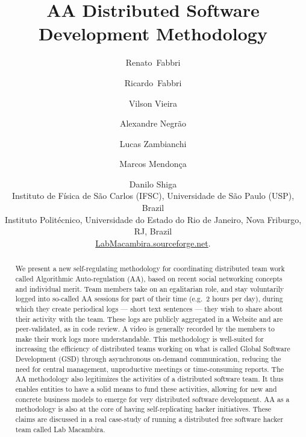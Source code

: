 \title{
AA Distributed Software Development Methodology
}

\author{%
Renato~Fabbri \and Ricardo~Fabbri \and Vilson Vieira \and Alexandre Negr\~{a}o \and Lucas Zambianchi
\and Marcos Mendon\c{c}a \and Danilo Shiga\\[1em]
\small{
Instituto de F\'{i}sica de S\~{a}o Carlos (IFSC), Universidade de
S\~{a}o Paulo (USP), Brazil}\\[0.5em]
\small{Instituto Polit\'{e}cnico, Universidade do Estado do Rio de
Janeiro, Nova Friburgo, RJ, Brazil}\\[0.5em]
\url{LabMacambira.sourceforge.net}.
}


\maketitle

\begin{abstract}
We present a new self-regulating methodology for coordinating
distributed team work called Algorithmic Auto-regulation (AA), based
on recent social networking concepts and individual merit. Team
members take on an egalitarian role, and stay voluntarily logged into
so-called AA sessions for part of their time (e.g.\ 2 hours per day),
during which they create periodical logs --- short text sentences ---
they wish to share about their activity with the team. These logs are
publicly aggregated in a Website and are peer-validated, as in code
review. A video is generally recorded by the members to make their
work logs more understandable. This methodology is well-suited for
increasing the efficiency of distributed teams working on what is
called Global Software Development (GSD) through asynchronous
on-demand communication, reducing the need for central management,
unproductive meetings or time-consuming reports. The AA methodology
also legitimizes the activities of a distributed software team.  It
thus enables entities to have a solid means to fund these activities,
allowing for new and concrete business models to emerge for very
distributed software development. AA as a methodology is also at the
core of having self-replicating hacker initiatives. These claims are
discussed in a real case-study of running a distributed free software
hacker team called Lab Macambira.
\end{abstract}

